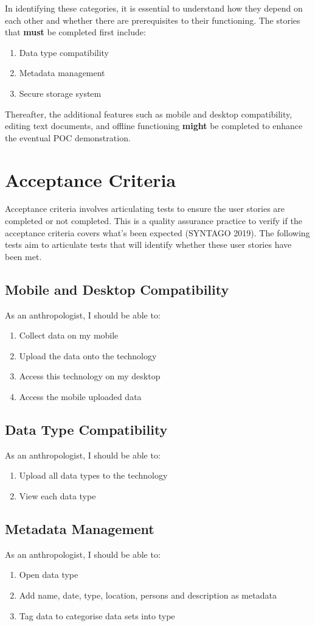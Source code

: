 \documentclass{article}
\begin{document}
In identifying these categories, it is essential to understand how they depend on each other and whether there are prerequisites to their functioning. The stories that \textbf{must} be completed first include:
\begin{enumerate}
\item Data type compatibility
\item Metadata management
\item Secure storage system
\end{enumerate}
Thereafter, the additional features such as mobile and desktop compatibility, editing text documents, and offline functioning \textbf{might} be completed to enhance the eventual POC demonstration. 

\section{Acceptance Criteria}
Acceptance criteria involves articulating tests to ensure the user stories are completed or not completed. This is a quality assurance practice to verify if the acceptance criteria covers what's been expected (SYNTAGO 2019). The following tests aim to articulate tests that will identify whether these user stories have been met. 

\subsection*{Mobile and Desktop Compatibility}
As an anthropologist, I should be able to:
\begin{enumerate}
\item Collect data on my mobile
\item Upload the data onto the technology
\item Access this technology on my desktop
\item Access the mobile uploaded data 
\end{enumerate}

\subsection*{Data Type Compatibility}
As an anthropologist, I should be able to:
\begin{enumerate}
\item Upload all data types to the technology
\item View each data type 
\end{enumerate}

\subsection*{Metadata Management}
As an anthropologist, I should be able to:
\begin{enumerate}
\item Open data type
\item Add name, date, type, location, persons and description as metadata
\item Tag data to categorise data sets into type
\end{enumerate}
\end{document}
